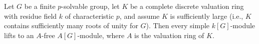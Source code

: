 Let $G$ be a finite $p$-solvable group, let $K$ be a complete discrete valuation ring with residue field $k$ of characteristic $p$, and assume $K$ is sufficiently large (i.e., $K$ contains sufficiently many roots of unity for $G$). Then every simple $k[G]$-module lifts to an $A$-free $A[G]$-module, where $A$ is the valuation ring of $K$.
